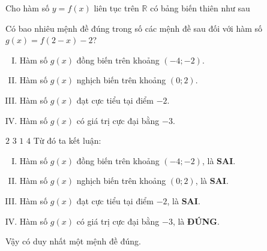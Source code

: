 \begin{ex}%
	Cho hàm số $y=f(x)$ liên tục trên $\mathbb{R}$ có bảng biến thiên như sau
	\begin{center}
	\end{center}
 Có bao nhiêu mệnh đề đúng trong số các mệnh đề sau đối với hàm số $g(x) =f(2-x)-2$?
	\begin{enumerate}[I.]
			\item Hàm số $g(x)$ đồng biến trên khoảng $(-4;-2).$
			\item  Hàm số $g(x)$ nghịch biến trên khoảng $(0;2).$
			\item Hàm số $g(x)$ đạt cực tiểu tại điểm $-2$.
			\item Hàm số $g(x)$ có giá trị cực đại bằng $-3$.
	\end{enumerate}

	\choice 
	{$2$}
	{$3$}
	{\True $1$}
	{$4$}
	Từ đó ta kết luận:
	\begin{enumerate}[I.]
		\item Hàm số $g(x)$ đồng biến trên khoảng $(-4;-2)$, là \textbf{SAI}.
		\item  Hàm số $g(x)$ nghịch biến trên khoảng $(0;2)$, là \textbf{SAI}.
		\item Hàm số $g(x)$ đạt cực tiểu tại điểm $-2$, là \textbf{SAI}.
		\item Hàm số $g(x)$ có giá trị cực đại bằng $-3$, là \textbf{ĐÚNG}.
	\end{enumerate}
Vậy có duy nhất một mệnh đề đúng.
\end{ex}



